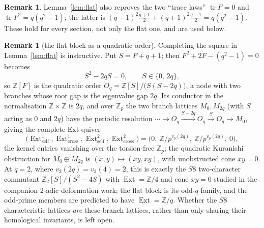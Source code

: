 \documentclass[11pt]{article}
\theoremstyle{plain}
\theoremstyle{definition}
\newtheorem{remark}[theorem]{Remark}
\newcommand{\ZZ}{\mathbb Z}
\newcommand{\Ext}{\operatorname{Ext}}
\newcommand{\tr}{\operatorname{tr}}
\begin{document}
\begin{remark}
Lemma~\ref{lem:flat} also reproves the two ``trace laws''
$\tr F=0$ and $\tr F^2=q(q^2-1)$; the latter is
$(q-1)^2\frac{q+1}{2}+(q+1)^2\frac{q-1}{2}=q(q^2-1)$. These hold for every
section, not only the flat one, and are used below.
\end{remark}

\begin{remark}[the flat block as a quadratic order]\label{rem:commutant}
Completing the square in Lemma~\ref{lem:flat} is instructive. Put $S=F+q+1$;
then $F^2+2F-(q^2-1)=0$ becomes
\[
S^2-2qS=0,\qquad S\in\{0,\,2q\},
\]
so $\ZZ[F]$ is the quadratic order $O_q=\ZZ[S]/\bigl(S(S-2q)\bigr)$, a node with
two branches whose root gap is the eigenvalue gap $2q$. Its conductor in the
normalisation $\ZZ\times\ZZ$ is $2q$, and over $\ZZ_p$ the two branch lattices
$M_0,M_{2q}$ (with $S$ acting as $0$ and $2q$) have the periodic resolution
$\cdots\to O_q\xrightarrow{S-2q}O_q\xrightarrow{S}O_q\to M_0$, giving the
complete Ext quiver
\[
\bigl(\Ext^1_{\mathrm{self}},\Ext^1_{\mathrm{cross}},
      \Ext^2_{\mathrm{self}},\Ext^2_{\mathrm{cross}}\bigr)
=\bigl(0,\ \ZZ/p^{v_p(2q)},\ \ZZ/p^{v_p(2q)},\ 0\bigr),
\]
the kernel entries vanishing over the torsion-free $\ZZ_p$; the quadratic
Kuranishi obstruction for $M_0\oplus M_{2q}$ is $(x,y)\mapsto(xy,xy)$, with
unobstructed cone $xy=0$. At $q=2$, where $v_2(2q)=v_2(4)=2$, this is exactly
the $S8$ two-character commutant $\ZZ_2[S]/(S^2-4S)$ with $\Ext=\ZZ/4$ and cone
$xy=0$ studied in the companion 2-adic deformation work; the flat block is its
odd-$q$ family, and the odd-prime members are predicted to have $\Ext=\ZZ/q$.
Whether the $S8$ characteristic lattices \emph{are} these branch lattices,
rather than only sharing their homological invariants, is left open.
\end{remark}
\end{document}
